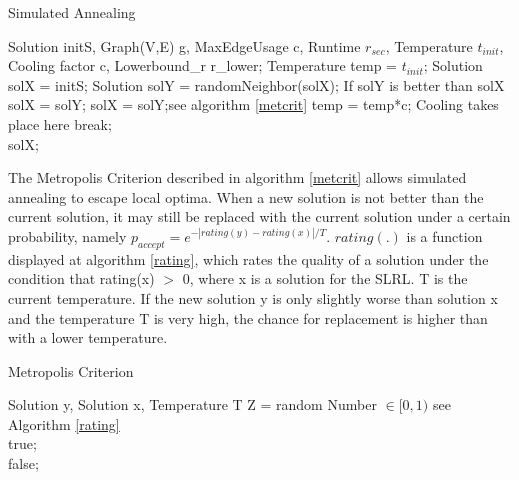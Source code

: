 \documentclass [12pt]{article}
\begin{document}
\begin {algorithm} [H]
\caption {Simulated Annealing}
\label {simA}
\begin {algorithmic} [3]
\Require Solution initS, Graph(V,E) g, MaxEdgeUsage c, Runtime $r_{sec}$, Temperature $t_{init}$, Cooling factor c,
        Lowerbound\_r r\_lower; 
        \State Temperature temp = $t_{init}$;
        \State Solution solX = initS; 
        \State Solution solY = randomNeighbor(solX);
         \Comment If solY is better than solX
                \State solX = solY;
         \Else
                    \State solX = solY;\Comment see algorithm \ref{metcrit}
                \EndIf
        \EndIf    
            \State temp = temp*c; \Comment Cooling takes place here
               \State break;
            \EndIf 
      \EndWhile\\
      \Return solX;
\end {algorithmic}
\end {algorithm}

The Metropolis Criterion described in algorithm \ref{metcrit} allows simulated annealing to escape local optima. When a new solution is not better 
than the current solution, it may still be replaced with the current solution under a certain probability,
namely $p_{accept}=e^{-|rating(y)-rating(x)|/T}$. $rating(.)$ is a function displayed at algorithm \ref{rating}, which rates the quality of a solution under the condition
that rating(x) $>$ 0, where x is a solution for the SLRL. T is the current temperature. If the new solution y is only slightly worse than solution x and the temperature T is very high,
the chance for replacement is higher than with a lower temperature.

\begin {algorithm} [H]
\caption {Metropolis Criterion}
\label {metcrit}
\begin {algorithmic} [3]
\Require Solution y, Solution x, Temperature T
\State Z = random Number $\in [0,1)$
   \Comment see Algorithm \ref{rating}\\
\Return true;
\EndIf\\
\Return false;
\end {algorithmic}
\end {algorithm}
\end{document}
